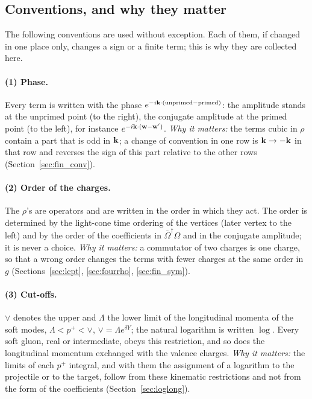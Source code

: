 \subsection{Conventions, and why they matter}\label{sec:conv_list}

The following conventions are used without exception. Each of them, if changed in one place only, changes a sign or a finite term; this is why they are collected here.

\paragraph{(1) Phase.} Every term is written with the phase $e^{-i\mathbf{k}\cdot(\text{unprimed}-\text{primed})}$: the amplitude stands at the unprimed point (to the right), the conjugate amplitude at the primed point (to the left), for instance $e^{-i\mathbf{k}\cdot(\mathbf{w}-\mathbf{w}')}$. \emph{Why it matters:} the terms cubic in $\rho$ contain a part that is odd in $\mathbf{k}$; a change of convention in one row is $\mathbf{k}\to-\mathbf{k}$ in that row and reverses the sign of this part relative to the other rows (Section~\ref{sec:fin_conv}).

\paragraph{(2) Order of the charges.} The $\rho$'s are operators and are written in the order in which they act. The order is determined by the light-cone time ordering of the vertices (later vertex to the left) and by the order of the coefficients in $\bar\Omega^\dagger\Omega$ and in the conjugate amplitude; it is never a choice. \emph{Why it matters:} a commutator of two charges is one charge, so that a wrong order changes the terms with fewer charges at the same order in $g$ (Sections~\ref{sec:lcpt}, \ref{sec:fourrho}, \ref{sec:fin_sym}).

\paragraph{(3) Cut-offs.} $\vee$ denotes the upper and $\Lambda$ the lower limit of the longitudinal momenta of the soft modes, $\Lambda<p^+<\vee$, $\vee=\Lambda e^{\delta Y}$; the natural logarithm is written $\log$. Every soft gluon, real or intermediate, obeys this restriction, and so does the longitudinal momentum exchanged with the valence charges. \emph{Why it matters:} the limits of each $p^+$ integral, and with them the assignment of a logarithm to the projectile or to the target, follow from these kinematic restrictions and not from the form of the coefficients (Section~\ref{sec:loglong}).

